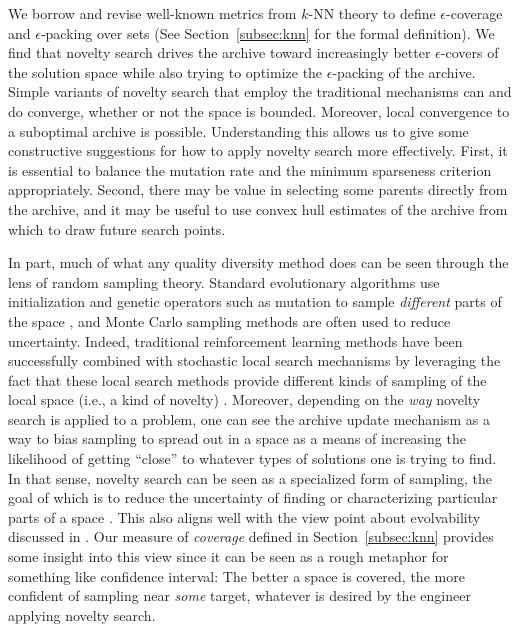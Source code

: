 \documentclass[twoside]{article}
\begin{document}
We borrow and revise well-known metrics from $k$-NN theory \citep{Clarkson1999dcg} to define $\epsilon$-coverage and $\epsilon$-packing over sets (See Section~\ref{subsec:knn} for the formal definition). We find that novelty search drives the archive toward increasingly better $\epsilon$-covers of the solution space while also trying to optimize the $\epsilon$-packing of the archive.  Simple variants of novelty search that employ the traditional mechanisms can and do converge, whether or not the space is bounded.  Moreover, local convergence to a suboptimal archive is possible.  
Understanding this allows us to give some constructive suggestions for how to apply novelty search more effectively.  First, it is essential to balance the mutation rate and the minimum sparseness criterion appropriately. Second, there may be value in selecting some parents directly from the archive, and it may be useful to use convex hull estimates of the archive from which to draw future search points.

In part, much of what any quality diversity method does can be seen through the lens of random sampling theory.  Standard evolutionary algorithms use initialization and genetic operators such as mutation to sample \emph{different} parts of the space \citep{ec:DeJong2006}, and Monte Carlo sampling methods are often used to reduce uncertainty.  Indeed, traditional reinforcement learning methods have been successfully combined with stochastic local search mechanisms by leveraging the fact that these local search methods provide different kinds of sampling of the local space (i.e., a kind of novelty) \citep{Boyan1998aaai}.  Moreover, depending on the \emph{way} novelty search is applied to a problem, one can see the archive update mechanism as a way to bias sampling to spread out in a space as a means of increasing the likelihood of getting ``close'' to whatever types of solutions one is trying to find.  In that sense, novelty search can be seen as a specialized form of sampling, the goal of which is to reduce the uncertainty of finding or characterizing particular parts of a space \citep{GrinsteadSnell2006, Sfikas2021gecco}.  This also aligns well with the view point about evolvability discussed in \citet{LehmanStanley2013plosone}.  Our measure of \emph{coverage} defined in Section~\ref{subsec:knn} provides some insight into this view since it can be seen as a rough metaphor for something like confidence interval:  The better a space is covered, the more confident of sampling near \emph{some} target, whatever is desired by the engineer applying novelty search.
\end{document}
